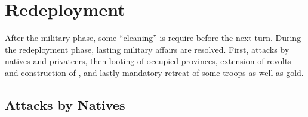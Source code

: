 \chapter{Redeployment}\label{chapter:Redep}

After the military phase, some ``cleaning'' is require before the next
turn. During the redeployment phase, lasting military affairs are
resolved. First, attacks by natives and privateers, then looting of occupied
provinces, extension of revolts and construction of \Presidios, and lastly
mandatory retreat of some troops as well as gold.

\RedepPhase

\section{Attacks by Natives}\label{chRedep:Native Attack}

